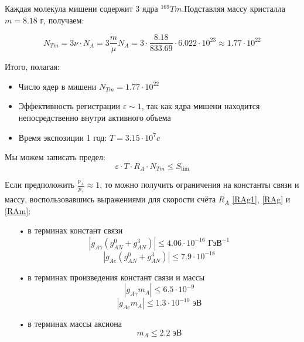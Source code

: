 \documentclass[a4paper,article,14pt]{extarticle}
\begin{document}
Каждая молекула мишени содержит 3 ядра $^{169}Tm$.Подставляя массу кристалла $m= 8.18 \text{ г}$, получаем:

\begin{equation}
   {N_{Tm}} = 3\nu  \cdot {N_A} = 3\frac{m}{\mu }{N_A} = 3 \cdot \frac{{8.18}}{{833.69}} \cdot 6.022 \cdot {10^{23}} \approx 1.77 \cdot {10^{22}}
\end{equation}

Итого, полагая:
\begin{itemize}
    \item Число ядер в мишени $N_{Tm} = 1.77 \cdot {10^{22}}$
    \item Эффективность регистрации $\varepsilon \sim 1 $, так как ядра мишени находится непосредственно внутри активного объема
    \item Время экспозиции 1 год: $T = 3.15 \cdot {10^7} c$
\end{itemize}

Мы можем записать предел:
\begin{equation}
   \varepsilon  \cdot T \cdot {R_A} \cdot N_{Tm} \leqslant {S_{\lim }}
\end{equation}

Если предположить $\frac{{{p_A}}}{{{p_\gamma}}} \approx 1$, то можно получить ограничения на константы связи и массу, воспользовавшись выражениями для скорости счёта ${R_A}$ \eqref{RAg1}, \eqref{RAg} и \eqref{RAm}:

\begin{enumerate}
    \item[•] в терминах констант связи
    \begin{equation}
         \left| g_{A\gamma}{\left( {g_{AN}^0 + g_{AN}^3} \right)} \right| \leqslant 4.06 \cdot 10^{-16} \text{ ГэВ}^{-1}
    \end{equation}
    \begin{equation}
         \left| g_{Ae}{\left( {g_{AN}^0 + g_{AN}^3} \right)} \right| \leqslant 7.9 \cdot 10^{-18}
    \end{equation}
    \item[•] в терминах произведения констант связи и массы
    \begin{equation}
        \left| {{g_{A\gamma}}{m_A}} \right| \leqslant 6.5 \cdot 10^{-9}
    \end{equation}
    \begin{equation}
        \left| {{g_{Ae}}{m_A}} \right| \leqslant 1.3 \cdot 10^{-10} \text{ эВ}
    \end{equation}
    \item[•] в терминах массы аксиона
    \begin{equation}
        m_A \leqslant 2.2 \text{ эВ}
    \end{equation}
\end{enumerate}
\end{document}
